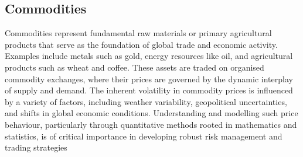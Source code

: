     \subsection{Commodities}
        \label{sec:commodities}

        Commodities represent fundamental raw materials or primary agricultural products
        that serve as the foundation of global trade and economic activity.
        Examples include metals such as gold, energy resources like oil,
        and agricultural products such as wheat and coffee. These assets are traded on organised commodity exchanges,
        where their prices are governed by the dynamic interplay of supply and demand.
        The inherent volatility in commodity prices is influenced by a variety of factors,
        including weather variability, geopolitical uncertainties,
        and shifts in global economic conditions\cite{wilmott_paul_2007}.
        Understanding and modelling such price behaviour,
        particularly through quantitative methods rooted in mathematics and statistics,
        is of critical importance in developing robust risk management and trading strategies

